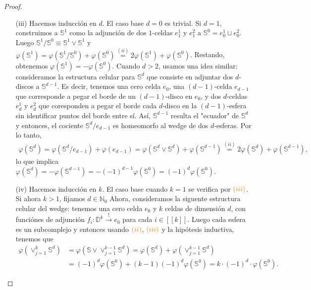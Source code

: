 \documentclass[11pt]{article}
\newcommand{\N}{\mathbb{N}}
\newcommand{\D}{\mathbb{D}}
\newcommand{\Ss}{\mathbb{S}}
\newcommand{\nat}[1]{[\![#1]\!]}
\newcommand{\paint}[2]{\color{#1}{#2}}
\begin{document}
\begin{proof}
\begin{itemize}
\item[(iii)] Hacemos inducci\'on en $d$. El caso base $d = 0$ es trivial. Si $d = 1$, construimos a $\Ss^1$ como la adjunci\'on de dos $1$-celdas $e_1^1$ y $e_1^2$ a $\Ss^0 = e_0^1 \sqcup e_0^2$. Luego $\Ss^1/\Ss^0 \equiv \Ss^1 \vee \Ss^1$ y $\varphi(\Ss^1) = \varphi(\Ss^1/\Ss^0) + \varphi(\Ss^0) \stackrel{(ii)}{=} 2\varphi(\Ss^1) + \varphi(\Ss^0)$. Restando, obtenemos $\varphi(\Ss^1) = -\varphi(\Ss^0)$. Cuando $d >2$, usamos una idea similar: consideramos la estructura celular para $\Ss^d$ que consiste en adjuntar dos $d$-discos a $\Ss^{d-1}$. Es decir, tenemos una cero celda $e_0$, una $(d-1)$-celda $e_{d-1}$ que corresponde a pegar el borde de un $(d-1)$-disco en $e_0$, y dos $d$-celdas $e_d^1$ y $e_d^2$ que coresponden a pegar el borde cada $d$-disco en la $(d-1)$-esfera sin identificar puntos del borde entre s\'i. As\'i, $\Ss^{d-1}$ resulta el "ecuador" de $\Ss^{d}$ y entonces, el cociente $\Ss^d/e_{d-1}$ es homeomorfo al wedge de dos $d$-esferas. Por lo tanto, 
\begin{align*}
\varphi(\Ss^d) = \varphi(\Ss^d/e_{d-1}) + \varphi(e_{d-1}) = \varphi(\Ss^d \vee \Ss^d) + \varphi(\Ss^{d-1}) \stackrel{(ii)}{=} 2\varphi(\Ss^d) + \varphi(\Ss^{d-1}),
\end{align*}
lo que implica $\varphi(\Ss^d) = - \varphi(\Ss^{d-1}) = -(-1)^{d-1}\varphi(\Ss^0) = (-1)^d\varphi(\Ss^0)$.
\item[(iv)] Hacemos inducci\'on en $k$. El caso base cuando $k=1$ se verifica por $\paint{orange}{(iii)}$. Si ahora $k  > 1$, fijamos $d \in \N_0$ Ahora, consideramos la siguente estructura celular del wedge: tenemos una cero celda $e_0$ y $k$ celdas de dimensi\'on $d$, con funci\'ones de adjunci\'on $f_i : \D^k \xrightarrow{!} e_0$ para cada $i \in \nat{k}$. Luego cada esfera es un subcomplejo y entonces usando $\paint{orange}{(ii)}$, $\paint{orange}{(iii)}$ y la hip\'otesis inductiva, tenemos que
\begin{align*}
\varphi(\vee_{j =1}^k\Ss^d) &= \varphi(\Ss \vee \vee_{j =1}^{k-1}\Ss^d) = \varphi(\Ss^d) + \varphi(\vee_{j =1}^{k-1}\Ss^d) \\
&= (-1)^d\varphi(\Ss^0) + (k-1)(-1)^d\varphi(\Ss^0) = k \cdot (-1)^d \cdot \varphi(\Ss^0).
\end{align*}
\end{itemize}
\end{proof}
\end{document}
